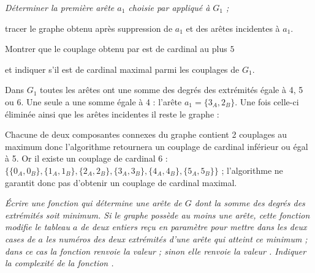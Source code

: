 \begin{Exercise}\it
Déterminer la première arête $a_1$ choisie par  appliqué à $G_1$ ; 

tracer le graphe obtenu après suppression de $a_1$ et des arêtes incidentes à $a_1$. 

Montrer que le couplage obtenu par  est de cardinal au plus $5$ 

et indiquer s'il est de cardinal maximal parmi les couplages de $G_1$.
\end{Exercise}
\begin{Answer}
Dans $G_1$ toutes les arêtes ont une somme des degrés des extrémités égale à 4, 5 ou 6. Une seule a une somme égale à 4 : l'arête $a_1=\{3_A,2_B\}$. Une fois celle-ci éliminée ainsi que les arêtes incidentes il reste le graphe :
\begin{center}
\end{center}
Chacune de deux composantes connexes du graphe contient 2 couplages au maximum donc l'algorithme retournera un couplage de cardinal inférieur ou égal à 5. Or il existe un couplage de cardinal 6 : $\{\{0_A, 0_B\}, \{1_A, 1_B\}, \{2_A, 2_B\}, \{3_A, 3_B\}, \{4_A, 4_B\}, \{5_A, 5_B\}\}$ ; l'algorithme ne garantit donc pas d'obtenir un couplage de cardinal maximal.
\end{Answer}
\begin{Exercise}\it
Écrire une fonction  qui détermine une arête de $G$ dont la somme des degrés des extrémités soit minimum. Si le graphe possède au moins une arête, cette fonction modifie le tableau $a$ de deux entiers reçu en paramètre pour mettre dans les deux cases de $a$ les numéros des deux extrémités d'une arête qui atteint ce minimum ; dans ce cas la fonction renvoie la valeur  ; sinon elle renvoie la valeur .
Indiquer la complexité de la fonction .
\end{Exercise}
